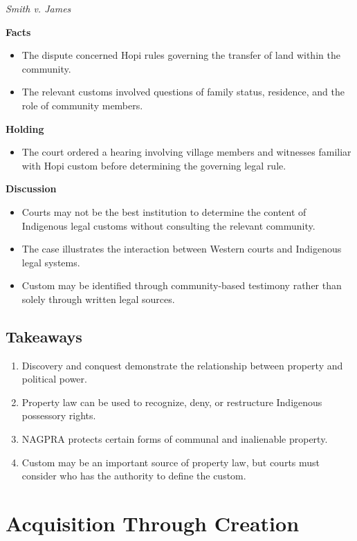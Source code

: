 \documentclass[11pt]{tex/lawoutline}
\begin{document}
\casebox
{\textit{Smith v. James}}
{}
{
\textbf{Facts}
\begin{itemize}
    \item The dispute concerned Hopi rules governing the transfer of land within the community.
    \item The relevant customs involved questions of family status, residence, and the role of community members.
\end{itemize}

\textbf{Holding}
\begin{itemize}
    \item The court ordered a hearing involving village members and witnesses familiar with Hopi custom before determining the governing legal rule.
\end{itemize}

\textbf{Discussion}
\begin{itemize}
    \item Courts may not be the best institution to determine the content of Indigenous legal customs without consulting the relevant community.
    \item The case illustrates the interaction between Western courts and Indigenous legal systems.
    \item Custom may be identified through community-based testimony rather than solely through written legal sources.
\end{itemize}
}

\subsection{Takeaways}{
\begin{enumerate}
    \item Discovery and conquest demonstrate the relationship between property and political power.
    \item Property law can be used to recognize, deny, or restructure Indigenous possessory rights.
    \item NAGPRA protects certain forms of communal and inalienable property.
    \item Custom may be an important source of property law, but courts must consider who has the authority to define the custom.
\end{enumerate}
}


\section{Acquisition Through Creation}
\end{document}

